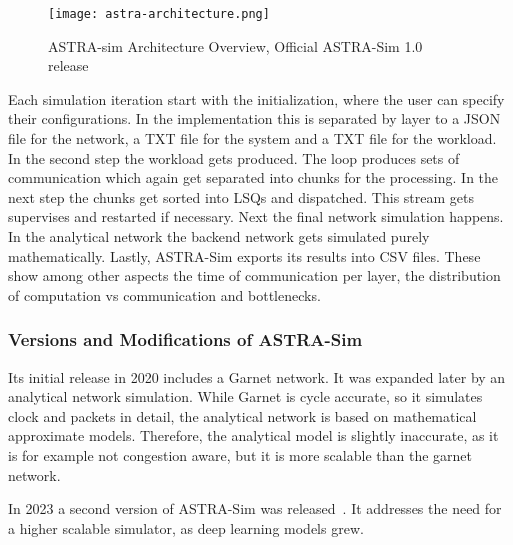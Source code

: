 \begin{figure}[H]
    \centering
    \texttt{[image: astra-architecture.png]}
    \caption{ASTRA-sim Architecture Overview, Official ASTRA-Sim 1.0 release~\cite{rashidi_astra-sim_2020}}
  \label{fig:astra-architecture}
\end{figure}

Each simulation iteration start with the initialization, where the user can specify their configurations. In the implementation this is separated by layer to a \ac{JSON} file for the network, a \ac{TXT} file for the system and a \ac{TXT} file for the workload. 
In the second step the workload gets produced. The loop produces sets of communication which again get separated into chunks for the processing.
In the next step the chunks get sorted into \acp{LSQ} and dispatched. This stream gets supervises and restarted if necessary. 
Next the final network simulation happens. In the analytical network the backend network gets simulated purely mathematically.
Lastly, \ac{ASTRA-Sim} exports its results into \ac{CSV} files. These show among other aspects the time of communication per layer, the distribution of computation vs communication and bottlenecks.


\subsubsection*{Versions and Modifications of ASTRA-Sim}
\label{sec:comparison}
Its initial release in 2020 includes a Garnet network. It was expanded later by an analytical network simulation. While Garnet is cycle accurate, so it simulates clock and packets in detail, the analytical network is based on mathematical approximate models. Therefore, the analytical model is slightly inaccurate, as it is for example not congestion aware, but it is more scalable than the garnet network.

In 2023 a second version of \ac{ASTRA-Sim} was released~\cite{won_astra-sim20_2023}. It addresses the need for a higher scalable simulator, as deep learning models grew. %

